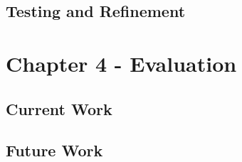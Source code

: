 \documentclass{article}
\begin{document}
\subsection{Testing and Refinement}


\section{Chapter 4 - Evaluation}

\subsection{Current Work}

\subsection{Future Work}
\end{document}
